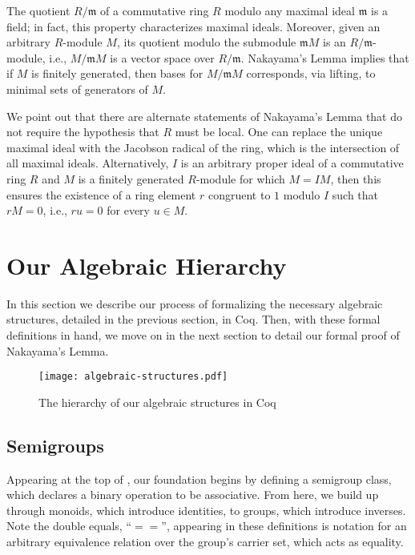 \documentclass{article}
\begin{document}
The quotient $R/\mathfrak{m}$ of a commutative ring $R$ modulo any maximal ideal 
$\mathfrak{m}$ is a field; in fact, this property characterizes maximal ideals. 
Moreover, given an arbitrary $R$-module $M$, its quotient modulo the
submodule $\mathfrak{m}M$ is an $R/\mathfrak{m}$-module, i.e.,
$M/\mathfrak{m}M$ is a vector space over $R/\mathfrak{m}$. Nakayama's Lemma
implies that if $M$ is finitely generated, then bases for $M/\mathfrak{m}M$
corresponds, via lifting, to minimal sets of generators of $M$. 

We point out that there are alternate statements of Nakayama's Lemma that do
not require the hypothesis that $R$ must be local. One can replace the unique
maximal ideal with the Jacobson radical of the ring, which is the intersection
of all maximal ideals. Alternatively, $I$ is an arbitrary proper ideal of a
commutative ring $R$ and $M$ is a finitely generated $R$-module for which
$M=I M$, then this ensures the existence of a ring element $r$ congruent to
$1$ modulo $I$ such that $r M = 0$, i.e., $r u = 0$ for every $u \in M$. 

\section{Our Algebraic Hierarchy}
In this section we describe our process of formalizing the necessary algebraic
structures, detailed in the previous section, in Coq. Then, with these formal definitions 
 in hand, we move
on in the next section to detail our formal proof of Nakayama's Lemma.

\begin{figure}[t]
  \caption{The hierarchy of our algebraic structures in Coq}
  \texttt{[image: algebraic-structures.pdf]}
  \centering
   \label{alg-heirarchy: F}
\end{figure}

\subsection{Semigroups} 
Appearing at the top of , our
 foundation begins by defining a semigroup class, which declares a binary
operation to be associative. From here, we build up through monoids, which
introduce identities, to groups, which introduce inverses. Note the double
equals, ``$==$'', appearing in these definitions is notation for an arbitrary
equivalence relation over the group's carrier set, which acts as equality.
\end{document}
